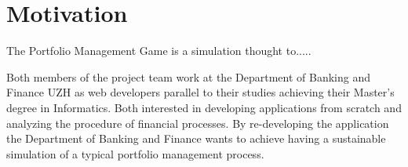 \section{Motivation}
The Portfolio Management Game is a simulation thought to.....

Both members of the project team work at the Department of Banking and Finance UZH as web developers parallel to their studies achieving their Master’s degree in Informatics. Both interested in developing applications from scratch and analyzing the procedure of financial processes. By re-developing the application the Department of Banking and Finance wants to achieve having a sustainable simulation of a typical portfolio management process.
